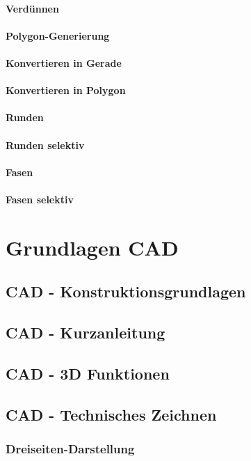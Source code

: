 \documentclass[14pt,a4paper]{book}
\begin{document}
			\subsubsection{Verdünnen} 
			\subsubsection{Polygon-Generierung} 
			\subsubsection{Konvertieren in Gerade} 
			\subsubsection{Konvertieren in Polygon}
			\subsubsection{Runden} 
			\subsubsection{Runden selektiv} 
			\subsubsection{Fasen} 
			\subsubsection{Fasen selektiv} 
						
\chapter{Grundlagen CAD}
	\section{CAD - Konstruktionsgrundlagen}
	\section{CAD - Kurzanleitung}
	\section{CAD - 3D Funktionen}
	\section{CAD - Technisches Zeichnen}
		\subsection{Dreiseiten-Darstellung}
\end{document}
